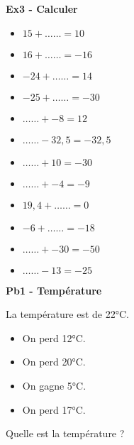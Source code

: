 \textbf{Ex3 - Calculer}

\begin{multicols}{3}
  \begin{itemize}[label={$\bullet$}]
    \item $15 + \ldots\ldots = 10 $ 
    \item $16 + \ldots\ldots = -16$ 
    \item $-24 + \ldots\ldots = 14$ 
    \item $-25 + \ldots\ldots = -30$\columnbreak
    \item $\ldots\ldots + -8 = 12$
    \item $\ldots\ldots - 32,5 = -32,5$
    \item $\ldots\ldots + 10 = -30$
    \item $\ldots\ldots + -4 = -9$ \columnbreak
    \item $19,4 + \ldots\ldots = 0$
    \item $-6 + \ldots\ldots = -18$
    \item $\ldots\ldots + -30 = -50$
    \item $\ldots\ldots - 13 = -25$
  \end{itemize} 
  \end{multicols}


\begin{minipage}[t]{0.3\textwidth}
  \textbf{Pb1 - Température}

  La température est de 22°C.  
  \begin{itemize}[label={$\bullet$}]
    \item On perd 12°C.
    \item On perd 20°C.
    \item On gagne 5°C.
    \item On perd 17°C.
  \end{itemize} 
  Quelle est la température ? 
\end{minipage}
\begin{minipage}[t]{0.7\textwidth}
  \Pointilles[8]
\end{minipage}  


